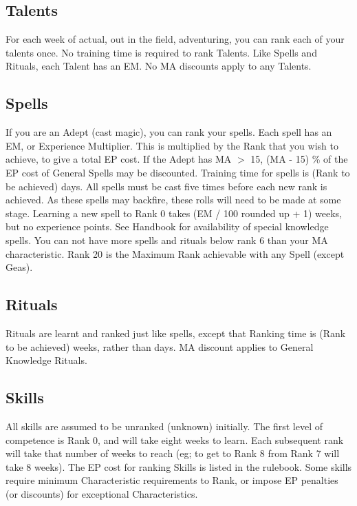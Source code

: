 \begin{multicols*}{3}
\subsection{Talents}

For each week of actual, out in the field, adventuring, you can rank
each of your talents once.  No training time is required to rank
Talents. Like Spells and Rituals, each Talent has an EM. No MA
discounts apply to any Talents.

\subsection{Spells}

If you are an Adept (\ie cast magic), you can rank your spells.
Each spell has an EM, or Experience Multiplier. This is multiplied by
the Rank that you wish to achieve, to give a total EP cost. If the
Adept has MA $>$ 15, (MA - 15) \% of the EP cost of General Spells
may be discounted. Training time for spells is (Rank to be achieved)
days.  All spells must be cast five times before each new rank is
achieved. As these spells may backfire, these rolls will need to be
made at some stage.  Learning a new spell to Rank 0 takes (EM / 100
rounded up + 1) weeks, but no experience points. See Handbook for
availability of special knowledge spells.  You can not have more
spells and rituals below rank 6 than your MA characteristic.  Rank 20
is the Maximum Rank achievable with any Spell (except Geas).

\subsection{Rituals}

Rituals are learnt and ranked just like spells, except that Ranking
time is (Rank to be achieved) weeks, rather than days.  MA discount
applies to General Knowledge Rituals.

\subsection{Skills}

All skills are assumed to be unranked (\ie unknown) initially. The
first level of competence is Rank 0, and will take eight weeks to
learn. Each subsequent rank will take that number of weeks to reach
(eg; to get to Rank 8 from Rank 7 will take 8 weeks). The EP cost for
ranking Skills is listed in the rulebook.  Some skills require minimum
Characteristic requirements to Rank, or impose EP penalties (or
discounts) for exceptional Characteristics.


\end{multicols*}
